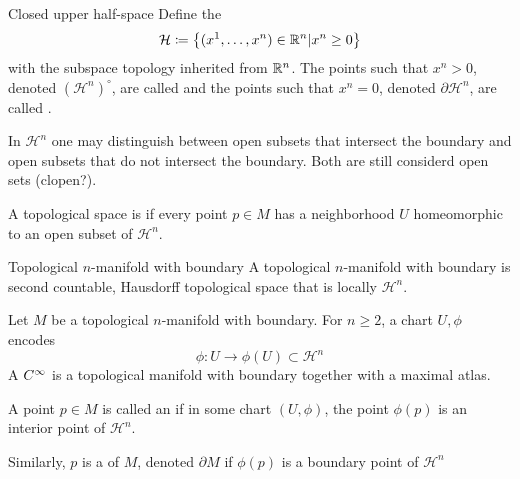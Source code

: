 \begin{definition}{Closed upper half-space}{}
    Define the 
    \[
        \mathcal{H} \coloneqq \left\{ (x^1, \dots, x^n) \in \mathbb{R}^n | x^n \geq 0 \right\}
    \]
    with the subspace topology inherited from \(\mathbb{R}^n\). 
    The points such that \(x^n >0 \), denoted \((\mathcal{H}^n)^\circ\), are called  and the points such that \(x^n = 0\), denoted \(\partial \mathcal{H}^n\), are called .
\end{definition}
\newcommand{\HH}{\mathcal{H}}
In \(\HH^n\) one may distinguish between open subsets that intersect the boundary and open subsets that do not intersect the boundary.
Both are still considerd open sets (clopen?).
\begin{definition}{}{}
    A topological space is \newterm{locally \(\HH^n\)} if every point \(p \in M\) has a neighborhood \(U\) homeomorphic to an open subset of \(\HH^n\).
\end{definition}
\begin{definition}{Topological \(n\)-manifold with boundary}{}
    A topological \(n\)-manifold with boundary is second countable, Hausdorff topological space that is locally \(\HH^n\).
\end{definition}

Let \(M\) be a topological \(n\)-manifold with boundary.
For \(n \geq 2\), a chart \(U, \phi\) encodes 
\[
    \phi \colon U \rightarrow \phi(U) \subset \HH^n   
\]
A \(C^\infty\)  is a topological manifold with boundary together with a maximal atlas.

A point \(p \in M\) is called an  if in some chart \((U, \phi)\), the point \(\phi(p)\) is an interior point of \(\HH^n\).

Similarly, \(p\) is a  of \(M\), denoted \(\partial M\) if \(\phi(p)\) is a boundary point of \(\HH^n\)


